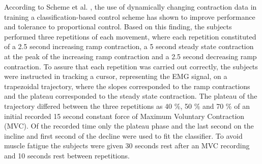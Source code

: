 According to Scheme et al. \cite{Scheme2015}, the use of dynamically changing contraction data in training a classification-based control scheme has shown to improve performance and tolerance to proportional control. Based on this finding, the subjects performed three repetitions of each movement, where each repetition constituted of a 2.5 second increasing ramp contraction, a 5 second steady state contraction at the peak of the increasing ramp contraction and a 2.5 second decreasing ramp contraction. To assure that each repetition was carried out correctly, the subjects were instructed in tracking a cursor, representing the EMG signal, on a trapezoidal trajectory, where the slopes corresponded to the ramp contractions and the plateau corresponded to the steady state contraction. The plateau of the trajectory differed between the three repetitions as 40 \%, 50 \% and 70 \% of an initial recorded 15 second constant force of Maximum Voluntary Contraction (MVC). Of the recorded time only the plateau phase and the last second on the incline and first second of the decline were used to fit the classifier. To avoid muscle fatigue the subjects were given 30 seconds rest after an MVC recording and 10 seconds rest between repetitions. 

